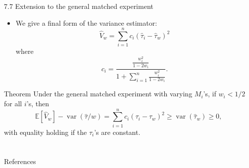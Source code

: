 \documentclass[aspectratio=169, 12pt]{beamer}
\begin{document}
\begin{frame}{7.7 Extension to the general matched experiment}
    \small
    \begin{itemize}
        \item We give a final form of the variance estimator:
        \[
        \hat{V}_w = \sum_{i=1}^{n}c_i(\hat{\tau}_i-\hat{\tau}_w)^2
        \]
        where
        \[
        c_i = \frac{\frac{w_i^2}{1-2w_i}}{1+\sum_{i=1}^{n}\frac{w_i^2}{1-2w_i}}.
        \]
    \end{itemize}
    \begin{keybox}{Theorem}
        Under the general matched experiment with varying $M_i$'s, if $w_i<1/2$ for all $i$'s, then
        \[
        \mathbb{E}[\hat{V}_w]-\operatorname{var}(\hat{\tau}/w)=\sum_{i=1}^{n}c_i(\tau_i-\tau_w)^2\geq \operatorname{var}(\hat{\tau}_w)\geq 0,
        \]
        with equality holding if the $\tau_i$'s are constant.
    \end{keybox}
\end{frame}



\section{}
\begin{frame}{References}
  \beamerdefaultoverlayspecification{}
  \small
  
\end{frame}
\end{document}
